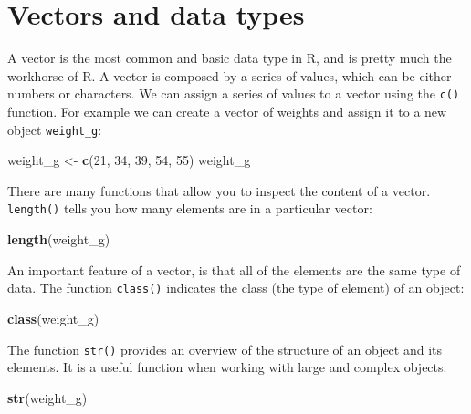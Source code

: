 \documentclass[]{book}
\newenvironment{Shaded}{\begin{snugshade}}{\end{snugshade}}
\newcommand{\KeywordTok}[1]{\textcolor[rgb]{0.13,0.29,0.53}{\textbf{#1}}}
\newcommand{\DecValTok}[1]{\textcolor[rgb]{0.00,0.00,0.81}{#1}}
\newcommand{\StringTok}[1]{\textcolor[rgb]{0.31,0.60,0.02}{#1}}
\newcommand{\NormalTok}[1]{#1}
\theoremstyle{definition}
\theoremstyle{definition}
\theoremstyle{definition}
\theoremstyle{remark}
\begin{document}
\section{Vectors and data types}\label{vectors-and-data-types}

A vector is the most common and basic data type in R, and is pretty much
the workhorse of R. A vector is composed by a series of values, which
can be either numbers or characters. We can assign a series of values to
a vector using the \texttt{c()} function. For example we can create a
vector of weights and assign it to a new object \texttt{weight\_g}:

\begin{Shaded}
\begin{Highlighting}[]
\NormalTok{weight_g <-}\StringTok{ }\KeywordTok{c}\NormalTok{(}\DecValTok{21}\NormalTok{, }\DecValTok{34}\NormalTok{, }\DecValTok{39}\NormalTok{, }\DecValTok{54}\NormalTok{, }\DecValTok{55}\NormalTok{)}
\NormalTok{weight_g}
\end{Highlighting}
\end{Shaded}

There are many functions that allow you to inspect the content of a
vector. \texttt{length()} tells you how many elements are in a
particular vector:

\begin{Shaded}
\begin{Highlighting}[]
\KeywordTok{length}\NormalTok{(weight_g)}
\end{Highlighting}
\end{Shaded}

An important feature of a vector, is that all of the elements are the
same type of data. The function \texttt{class()} indicates the class
(the type of element) of an object:

\begin{Shaded}
\begin{Highlighting}[]
\KeywordTok{class}\NormalTok{(weight_g)}
\end{Highlighting}
\end{Shaded}

The function \texttt{str()} provides an overview of the structure of an
object and its elements. It is a useful function when working with large
and complex objects:

\begin{Shaded}
\begin{Highlighting}[]
\KeywordTok{str}\NormalTok{(weight_g)}
\end{Highlighting}
\end{Shaded}
\end{document}
